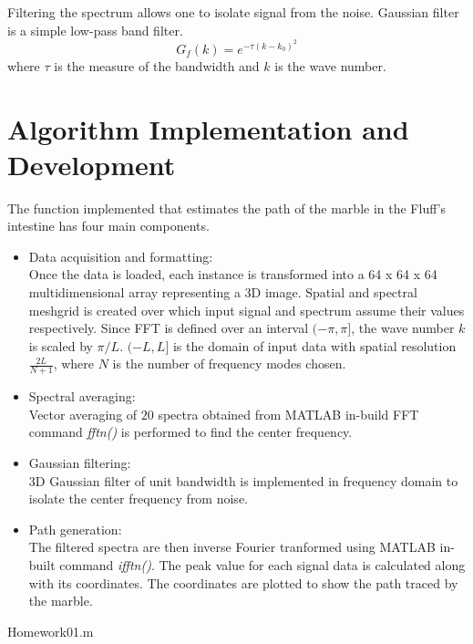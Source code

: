 \documentclass{article}
\begin{document}
Filtering the spectrum allows one to isolate signal from the noise. Gaussian filter is a simple low-pass band filter.
\[
G_f(k)=e^{-\tau (k - k_0)^2}
\]
where $\tau$ is the measure of the bandwidth and $k$ is the wave number.

\section{Algorithm Implementation and Development}\label{Algorithm}
The function implemented that estimates the path of the marble in the Fluff's intestine has four main components.
\begin{itemize}
\item Data acquisition and formatting: \\
Once the data is loaded, each instance is transformed into a 64 x 64 x 64 multidimensional array representing a 3D image. Spatial and spectral meshgrid is created over which input signal and spectrum assume their values respectively. Since FFT is defined over an interval $(-\pi, \pi]$, the wave number $k$ is scaled by $\pi /L$. $(-L, L]$ is the domain of input data with spatial resolution $\frac{2L}{N+1}$, where $N$ is the number of frequency modes chosen.
\item Spectral averaging: \\
Vector averaging of $20$ spectra obtained from MATLAB in-build FFT command \textit{fftn()} is performed to find the center frequency.
\item Gaussian filtering: \\
3D Gaussian filter  of unit bandwidth is implemented in frequency domain to isolate the center frequency from noise.
\item Path generation: \\
The filtered spectra are then inverse Fourier tranformed using MATLAB in-built command \textit{ifftn()}. The peak value for each signal data is calculated along with its coordinates. The coordinates are plotted to show the path traced by the marble.
\end{itemize}


\begin{algorithm}\label{alg:function}
\begin{algorithmic}
\ENDFOR
{}
\ENDFOR
\end{algorithmic}
\caption{Homework01.m}
\end{algorithm}
\end{document}
